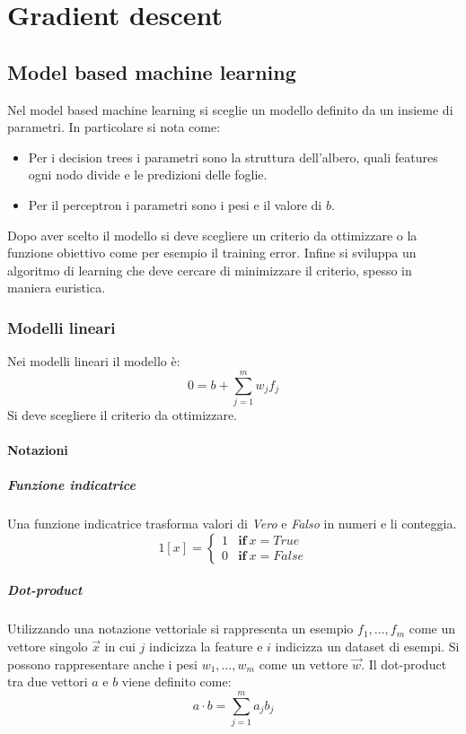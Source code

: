 \chapter{Gradient descent}

\section{Model based machine learning}
Nel model based machine learning si sceglie un modello definito da un insieme di parametri.
In particolare si nota come:
\begin{multicols}{2}
	\begin{itemize}
		\item Per i decision trees i parametri sono la struttura dell'albero, quali features ogni nodo divide e le predizioni delle foglie.
		\item Per il perceptron i parametri sono i pesi e il valore di $b$.
	\end{itemize}
\end{multicols}
Dopo aver scelto il modello si deve scegliere un criterio da ottimizzare o la funzione obiettivo come per esempio il training error.
Infine si sviluppa un algoritmo di learning che deve cercare di minimizzare il criterio, spesso in maniera euristica.

	\subsection{Modelli lineari}
	Nei modelli lineari il modello \`e:
	$$0=b+\sum\limits_{j=1}^mw_jf_j$$
	Si deve scegliere il criterio da ottimizzare.

		\subsubsection{Notazioni}
		
		\paragraph{Funzione indicatrice}
		Una funzione indicatrice trasforma valori di \emph{Vero} e \emph{Falso} in numeri e li conteggia.
		$$1[x]=\begin{cases}1&\mathbf{if}\ x = True\\
			0&\textbf{if}\ x = False
		\end{cases}$$
		
		\paragraph{Dot-product}
		Utilizzando una notazione vettoriale si rappresenta un esempio $f_1,\dots,f_m$ come un vettore singolo $\overrightarrow{x}$ in cui $j$ indicizza la feature e $i$ indicizza un dataset di esempi.
		Si possono rappresentare anche i pesi $w_1,\dots,w_m$ come un vettore $\overrightarrow{w}$.
		Il dot-product tra due vettori $a$ e $b$ viene definito come:
		$$a\cdot b = \sum\limits_{j=1}^ma_jb_j$$
		
